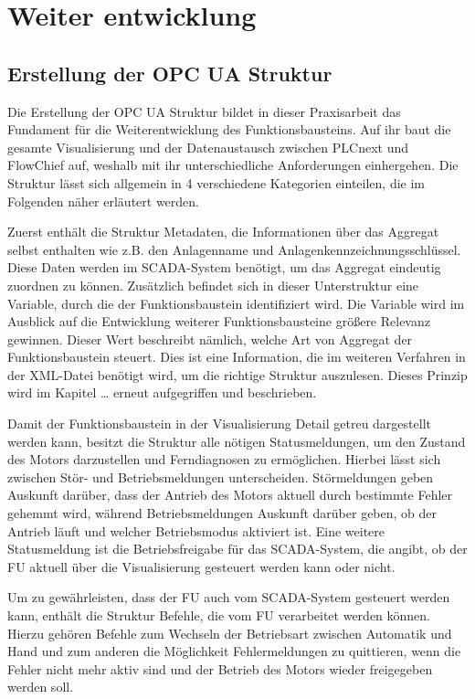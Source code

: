 \section{Weiter entwicklung}
\subsection{Erstellung der OPC UA Struktur}

Die Erstellung der OPC UA Struktur bildet in dieser Praxisarbeit das Fundament für die Weiterentwicklung des Funktionsbausteins. Auf ihr baut die gesamte Visualisierung und der Datenaustausch zwischen PLCnext und FlowChief auf, weshalb mit ihr unterschiedliche Anforderungen einhergehen. Die Struktur lässt sich allgemein in 4 verschiedene Kategorien einteilen, die im Folgenden näher erläutert werden.

Zuerst enthält die Struktur Metadaten, die Informationen über das Aggregat selbst enthalten wie z.B. den Anlagenname und Anlagenkennzeichnungsschlüssel. Diese Daten werden im SCADA-System benötigt, um das Aggregat eindeutig zuordnen zu können. Zusätzlich befindet sich in dieser Unterstruktur eine Variable, durch die der Funktionsbaustein identifiziert wird. Die Variable wird im Ausblick auf die Entwicklung weiterer Funktionsbausteine größere Relevanz gewinnen. Dieser Wert beschreibt nämlich, welche Art von Aggregat der Funktionsbaustein steuert. Dies ist eine Information, die im weiteren Verfahren in der XML-Datei benötigt wird, um die richtige Struktur auszulesen. Dieses Prinzip wird im Kapitel … erneut aufgegriffen und beschrieben.

Damit der Funktionsbaustein in der Visualisierung Detail getreu dargestellt werden kann, besitzt die Struktur alle nötigen Statusmeldungen, um den Zustand des Motors darzustellen und Ferndiagnosen zu ermöglichen. Hierbei lässt sich zwischen Stör- und Betriebsmeldungen unterscheiden. Störmeldungen geben Auskunft darüber, dass der Antrieb des Motors aktuell durch bestimmte Fehler gehemmt wird, während Betriebsmeldungen Auskunft darüber geben, ob der Antrieb läuft und welcher Betriebsmodus aktiviert ist. Eine weitere Statusmeldung ist die Betriebsfreigabe für das SCADA-System, die angibt, ob der FU aktuell über die Visualisierung gesteuert werden kann oder nicht.

Um zu gewährleisten, dass der FU auch vom SCADA-System gesteuert werden kann, enthält die Struktur Befehle, die vom FU verarbeitet werden können. Hierzu gehören Befehle zum Wechseln der Betriebsart zwischen Automatik und Hand und zum anderen die Möglichkeit Fehlermeldungen zu quittieren, wenn die Fehler nicht mehr aktiv sind und der Betrieb des Motors wieder freigegeben werden soll.

